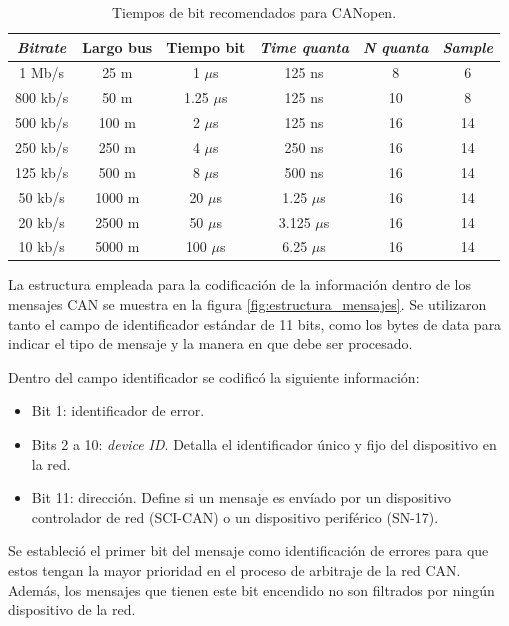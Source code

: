 \begin{table}[h!]
	\centering
	\caption[Tiempos de bit recomendados para CANopen.]{Tiempos de bit recomendados para CANopen.}
	\begin{tabular}{c c c c c c}    
		\toprule
		\textbf{\textit{Bitrate}} & \textbf{Largo bus} & \textbf{Tiempo bit} & \textbf{\textit{Time quanta}} & \textbf{\textit{N quanta}} & \textbf{\textit{Sample}} \\
		\midrule
		1 Mb/s 		& 25 m 	& 1 $\mu$s		& 125 ns & 8 	& 6 \\
		800 kb/s 	& 50 m 	& 1.25 $\mu$s	& 125 ns & 10 	& 8 \\
		500 kb/s 	& 100 m & 2 $\mu$s		& 125 ns & 16 	& 14 \\
		250 kb/s 	& 250 m & 4 $\mu$s		& 250 ns & 16 	& 14 \\
		125 kb/s 	& 500 m & 8 $\mu$s		& 500 ns & 16 	& 14 \\
		50 kb/s 	& 1000 m & 20 $\mu$s	& 1.25 $\mu$s & 16 	& 14 \\
		20 kb/s 	& 2500 m & 50 $\mu$s	& 3.125 $\mu$s & 16 	& 14 \\
		10 kb/s 	& 5000 m & 100 $\mu$s	& 6.25 $\mu$s & 16 	& 14 \\
		\bottomrule
		\hline
	\end{tabular}
	\label{tab:bit_times}
\end{table}


La estructura empleada para la codificación de la información dentro de los mensajes CAN se muestra en la figura \ref{fig:estructura_mensajes}. Se utilizaron tanto el campo de identificador estándar de 11 bits, como los bytes de data para indicar el tipo de mensaje y la manera en que debe ser procesado.

\newpage

Dentro del campo identificador se codificó la siguiente información:
\begin{itemize}
	\item Bit 1: identificador de error.
	\item Bits 2 a 10: \textit{device ID}. Detalla el identificador único y fijo del dispositivo en la red.
	\item Bit 11: dirección. Define si un mensaje es envíado por un dispositivo controlador de red (SCI-CAN) o un dispositivo periférico (SN-17).
\end{itemize}

Se estableció el primer bit del mensaje como identificación de errores para que  estos tengan la mayor prioridad en el proceso de arbitraje de la red CAN. Además, los mensajes que tienen este bit encendido no son filtrados por ningún dispositivo de la red.

